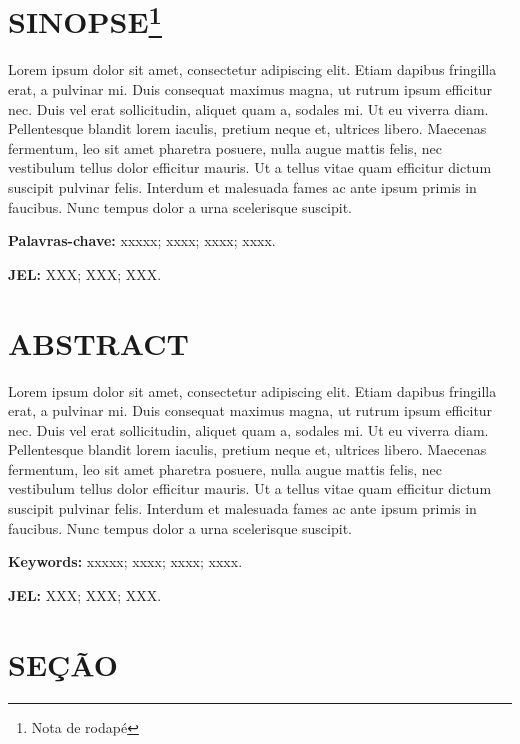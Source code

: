 \documentclass[
  12pt,
  a4paper,
]{td}
\begin{document}


\maketitle

\thispagestyle{fancy}


\section*{SINOPSE\footnote{Nota de rodapé}}

Lorem ipsum dolor sit amet, consectetur adipiscing elit. Etiam dapibus
fringilla erat, a pulvinar mi. Duis consequat maximus magna, ut rutrum
ipsum efficitur nec. Duis vel erat sollicitudin, aliquet quam a, sodales
mi. Ut eu viverra diam. Pellentesque blandit lorem iaculis, pretium
neque et, ultrices libero. Maecenas fermentum, leo sit amet pharetra
posuere, nulla augue mattis felis, nec vestibulum tellus dolor efficitur
mauris. Ut a tellus vitae quam efficitur dictum suscipit pulvinar felis.
Interdum et malesuada fames ac ante ipsum primis in faucibus. Nunc
tempus dolor a urna scelerisque suscipit.

\textbf{Palavras-chave:} xxxxx; xxxx; xxxx; xxxx.

\textbf{JEL:} XXX; XXX; XXX.

\section*{ABSTRACT}

Lorem ipsum dolor sit amet, consectetur adipiscing elit. Etiam dapibus
fringilla erat, a pulvinar mi. Duis consequat maximus magna, ut rutrum
ipsum efficitur nec. Duis vel erat sollicitudin, aliquet quam a, sodales
mi. Ut eu viverra diam. Pellentesque blandit lorem iaculis, pretium
neque et, ultrices libero. Maecenas fermentum, leo sit amet pharetra
posuere, nulla augue mattis felis, nec vestibulum tellus dolor efficitur
mauris. Ut a tellus vitae quam efficitur dictum suscipit pulvinar felis.
Interdum et malesuada fames ac ante ipsum primis in faucibus. Nunc
tempus dolor a urna scelerisque suscipit. \cite{nome2023}

\textbf{Keywords:} xxxxx; xxxx; xxxx; xxxx.

\textbf{JEL:} XXX; XXX; XXX.

\newpage{}

\section{SEÇÃO}
\end{document}
